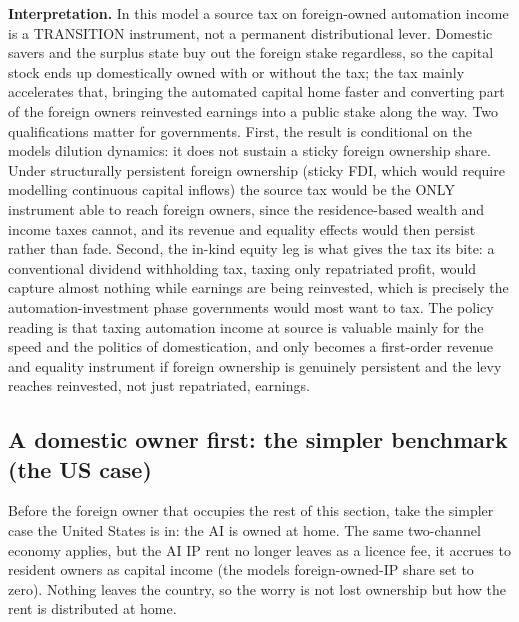 \documentclass[11pt]{article}
\begin{document}
\textbf{Interpretation.} In this model a source tax on foreign-owned
automation income is a TRANSITION instrument, not a permanent
distributional lever. Domestic savers and the surplus state buy out the
foreign stake regardless, so the capital stock ends up domestically
owned with or without the tax; the tax mainly accelerates that, bringing
the automated capital home faster and converting part of the foreign
owners\textquotesingle{} reinvested earnings into a public stake along
the way. Two qualifications matter for governments. First, the result is
conditional on the model\textquotesingle s dilution dynamics: it does
not sustain a sticky foreign ownership share. Under structurally
persistent foreign ownership (sticky FDI, which would require modelling
continuous capital inflows) the source tax would be the ONLY instrument
able to reach foreign owners, since the residence-based wealth and
income taxes cannot, and its revenue and equality effects would then
persist rather than fade. Second, the in-kind equity leg is what gives
the tax its bite: a conventional dividend withholding tax, taxing only
repatriated profit, would capture almost nothing while earnings are
being reinvested, which is precisely the automation-investment phase
governments would most want to tax. The policy reading is that taxing
automation income at source is valuable mainly for the speed and the
politics of domestication, and only becomes a first-order revenue and
equality instrument if foreign ownership is genuinely persistent and the
levy reaches reinvested, not just repatriated, earnings.

\hypertarget{a-domestic-owner-first-the-simpler-benchmark-the-us-case}{%
\subsection{A domestic owner first: the simpler benchmark (the US
case)}\label{a-domestic-owner-first-the-simpler-benchmark-the-us-case}}

Before the foreign owner that occupies the rest of this section, take
the simpler case the United States is in: the AI is owned at home. The
same two-channel economy applies, but the AI IP rent no longer leaves as
a licence fee, it accrues to resident owners as capital income (the
model\textquotesingle s foreign-owned-IP share set to zero). Nothing
leaves the country, so the worry is not lost ownership but how the rent
is distributed at home.
\end{document}
